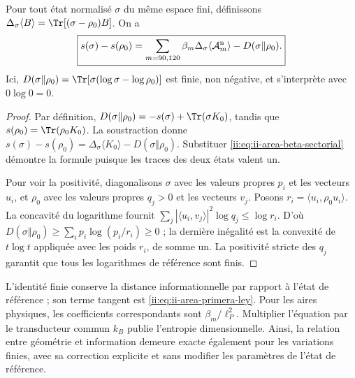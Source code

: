 \begin{theorem}
\label{ii:thm:ii-area-ley-finita}
Pour tout état normalisé \(\sigma\) du même espace fini,
définissons \(\Delta_\sigma\langle B\rangle
=\Tr[(\sigma-\rho_0)B]\). On a
\begin{equation}
 \boxed{
 s(\sigma)-s(\rho_0)
 =\sum_{m=90,120}\beta_m
      \Delta_\sigma\langle\mathcal A_m^{\rm n}\rangle
   -D(\sigma\Vert\rho_0).}
 \label{ii:eq:ii-area-ley-finita}
\end{equation}
Ici, \(D(\sigma\Vert\rho_0)=\Tr[\sigma(\log\sigma-\log\rho_0)]\)
est finie, non négative, et s'interprète avec \(0\log0=0\).
\end{theorem}
\begin{proof}
Par définition,
\(D(\sigma\Vert\rho_0)=-s(\sigma)+\Tr(\sigma K_0)\), tandis que
\(s(\rho_0)=\Tr(\rho_0K_0)\). La soustraction donne
\(s(\sigma)-s(\rho_0)=\Delta_\sigma\langle K_0\rangle
-D(\sigma\Vert\rho_0)\). Substituer
\eqref{ii:eq:ii-area-beta-sectorial} démontre la formule puisque les
traces des deux états valent un.

Pour voir la positivité, diagonalisons \(\sigma\) avec les valeurs propres
\(p_i\) et les vecteurs \(u_i\), et \(\rho_0\) avec les valeurs propres
\(q_j>0\) et les vecteurs \(v_j\). Posons
\(r_i=\langle u_i,\rho_0u_i\rangle\). La concavité du logarithme
fournit
\(\sum_j|\langle u_i,v_j\rangle|^2\log q_j\le\log r_i\).
D'où
\(D(\sigma\Vert\rho_0)\ge\sum_i p_i\log(p_i/r_i)\ge0\) ;
la dernière inégalité est la convexité de \(t\log t\) appliquée
avec les poids \(r_i\), de somme un. La positivité stricte des
\(q_j\) garantit que tous les logarithmes de référence sont finis.
\end{proof}

L'identité finie conserve la distance informationnelle par rapport à
l'état de référence ; son terme tangent est
\eqref{ii:eq:ii-area-primera-ley}. Pour les aires physiques, les
coefficients correspondants sont \(\beta_m/\ell_P^2\).
Multiplier l'équation par le transducteur commun \(k_B\) publie
l'entropie dimensionnelle. Ainsi, la relation entre géométrie et information
demeure exacte également pour les variations finies, avec sa correction
explicite et sans modifier les paramètres de l'état de référence.
